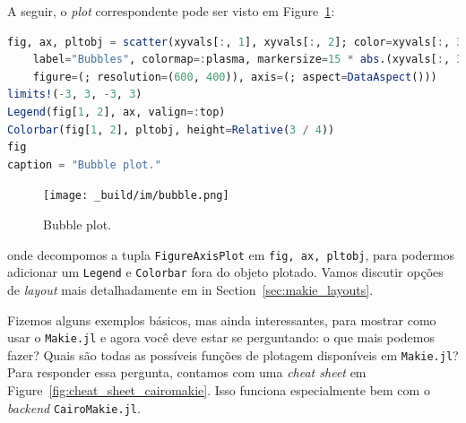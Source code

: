 \documentclass[
  notoc %
]{tufte-book}
\newcommand{\passthrough}[1]{#1}
\begin{document}
A seguir, o \emph{plot} correspondente pode ser visto em
Figure~\ref{fig:bubble}:

\begin{lstlisting}[language=Julia]
fig, ax, pltobj = scatter(xyvals[:, 1], xyvals[:, 2]; color=xyvals[:, 3],
    label="Bubbles", colormap=:plasma, markersize=15 * abs.(xyvals[:, 3]),
    figure=(; resolution=(600, 400)), axis=(; aspect=DataAspect()))
limits!(-3, 3, -3, 3)
Legend(fig[1, 2], ax, valign=:top)
Colorbar(fig[1, 2], pltobj, height=Relative(3 / 4))
fig
caption = "Bubble plot."
\end{lstlisting}

\begin{figure}
\hypertarget{fig:bubble}{%
\centering
\texttt{[image: \_build/im/bubble.png]}
\caption{Bubble plot.}\label{fig:bubble}
}
\end{figure}

onde decompomos a tupla \passthrough{\lstinline!FigureAxisPlot!} em
\passthrough{\lstinline!fig, ax, pltobj!}, para podermos adicionar um
\passthrough{\lstinline!Legend!} e \passthrough{\lstinline!Colorbar!}
fora do objeto plotado. Vamos discutir opções de \emph{layout} mais
detalhadamente em in Section~\ref{sec:makie_layouts}.

Fizemos alguns exemplos básicos, mas ainda interessantes, para mostrar
como usar o \passthrough{\lstinline!Makie.jl!} e agora você deve estar
se perguntando: o que mais podemos fazer? Quais são todas as possíveis
funções de plotagem disponíveis em \passthrough{\lstinline!Makie.jl!}?
Para responder essa pergunta, contamos com uma \emph{cheat sheet} em
Figure~\ref{fig:cheat_sheet_cairomakie}. Isso funciona especialmente bem
com o \emph{backend} \passthrough{\lstinline!CairoMakie.jl!}.
\end{document}
